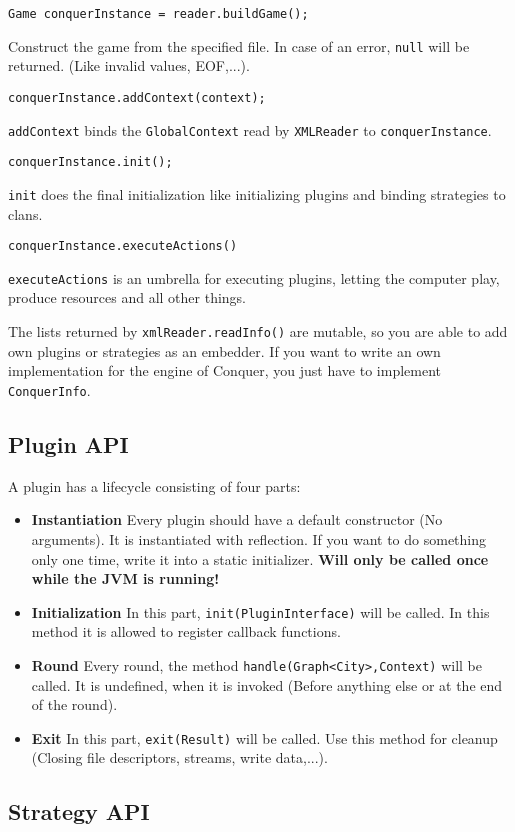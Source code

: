 \documentclass{article}
\begin{document}
\begin{verbatim}
Game conquerInstance = reader.buildGame();
\end{verbatim}
Construct the game from the specified file. In case of an error, \texttt{null} will be returned. (Like invalid values, EOF,...).
\begin{verbatim}
conquerInstance.addContext(context);
\end{verbatim}
\texttt{addContext} binds the \texttt{GlobalContext} read by \texttt{XMLReader} to \texttt{conquerInstance}.
\begin{verbatim}
conquerInstance.init();
\end{verbatim}
\texttt{init} does the final initialization like initializing plugins and binding strategies to clans.
\begin{verbatim}
conquerInstance.executeActions()
\end{verbatim}
\texttt{executeActions} is an umbrella for executing plugins, letting the computer play, produce resources and all other things.\newline

The lists returned by \texttt{xmlReader.readInfo()} are mutable, so you are able to add own plugins or strategies as an embedder.\newline
If you want to write an own implementation for the engine of Conquer, you just have to implement \texttt{ConquerInfo}.

\subsection{Plugin API}
A plugin has a lifecycle consisting of four parts:
\begin{itemize}
	\item \textbf{Instantiation} Every plugin should have a default constructor (No arguments). It is instantiated with reflection. If you want to do something only one time, write it into a static initializer. \textbf{Will only be called once while the JVM is running!}
	\item \textbf{Initialization} In this part, \texttt{init(PluginInterface)} will be called. In this method it is allowed to register callback functions. 
	\item \textbf{Round} Every round, the method \texttt{handle(Graph<City>,Context)} will be called. It is undefined, when it is invoked (Before anything else or at the end of the round).
	\item \textbf{Exit} In this part, \texttt{exit(Result)} will be called. Use this method for cleanup (Closing file descriptors, streams, write data,...).
	
\end{itemize}
\subsection{Strategy API}
\end{document}

